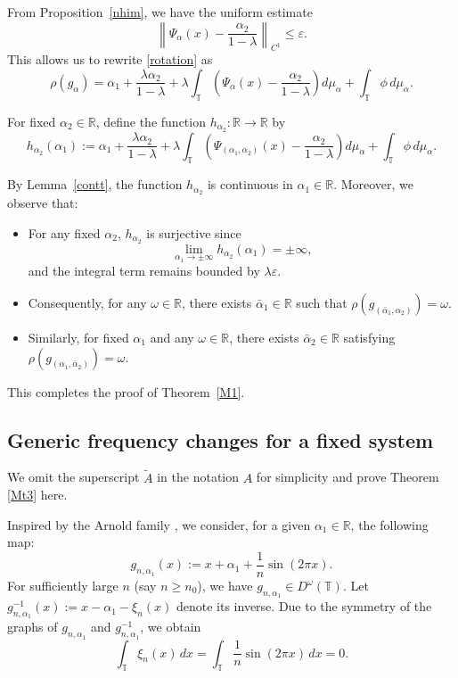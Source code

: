 \documentclass{amsart}
\newcommand{\R}{\mathbb{R}}
\newcommand{\T}{\mathbb{T}}
\theoremstyle{definition}
\begin{document}
From Proposition~\ref{nhim}, we have the uniform estimate
\[
\left\|\Psi_\alpha(x) - \frac{\alpha_2}{1-\lambda}\right\|_{C^1} \leq \varepsilon.
\]
This allows us to rewrite \eqref{rotation} as
\begin{equation}\label{rotation-rewritten}
\rho(g_\alpha) = \alpha_1 + \frac{\lambda\alpha_2}{1-\lambda} + \lambda \int_{\T} \left(\Psi_\alpha(x) - \frac{\alpha_2}{1-\lambda}\right) d\mu_\alpha+\int_{\T} \phi \, d\mu_\alpha.
\end{equation}

For fixed $\alpha_2 \in \R$, define the function $h_{\alpha_2}:\R\to\R$ by
\[
h_{\alpha_2}(\alpha_1) := \alpha_1 + \frac{\lambda\alpha_2}{1-\lambda} + \lambda \int_{\T} \left(\Psi_{(\alpha_1,\alpha_2)}(x) - \frac{\alpha_2}{1-\lambda}\right) d\mu_\alpha+\int_{\T} \phi \, d\mu_\alpha.
\]

By Lemma~\ref{contt}, the function $h_{\alpha_2}$ is continuous in $\alpha_1 \in \R$. Moreover, we observe that:
\begin{itemize}
\item For any fixed $\alpha_2$, $h_{\alpha_2}$ is surjective since
\[
\lim_{\alpha_1 \to \pm\infty} h_{\alpha_2}(\alpha_1) = \pm\infty,
\]
and the integral term remains bounded by $\lambda\varepsilon$.

\item Consequently, for any $\omega \in \R$, there exists $\bar{\alpha}_1 \in \R$ such that $\rho(g_{(\bar{\alpha}_1,\alpha_2)}) = \omega$.

\item Similarly, for fixed $\alpha_1$ and any $\omega \in \R$, there exists $\bar{\alpha}_2 \in \R$ satisfying $\rho(g_{(\alpha_1,\bar{\alpha}_2)}) = \omega$.
\end{itemize}

This completes the proof of Theorem~\ref{M1}.



\subsection{Generic frequency changes for a fixed system}
We omit the superscript $\tilde{A}$ in the notation $A$ for simplicity and prove Theorem \ref{Mt3} here.

Inspired by the Arnold family \cite{Ar}, we consider, for a given $\alpha_1 \in \R$, the following map:
\begin{equation}\label{g22}
g_{n,\alpha_1}(x) := x + \alpha_1 + \frac{1}{n} \sin(2\pi x).
\end{equation}
For sufficiently large $n$ (say $n\geq n_0$), we have $g_{n,\alpha_1} \in D^\omega(\T)$. Let $g_{n,\alpha_1}^{-1}(x) := x - \alpha_1 - \xi_n(x)$ denote its inverse. Due to the symmetry of the graphs of $g_{n,\alpha_1}$ and $g^{-1}_{n,\alpha_1}$, we obtain
\[
\int_{\T} \xi_n(x) \, dx = \int_{\T} \frac{1}{n} \sin(2\pi x) \, dx = 0.
\]
\end{document}
